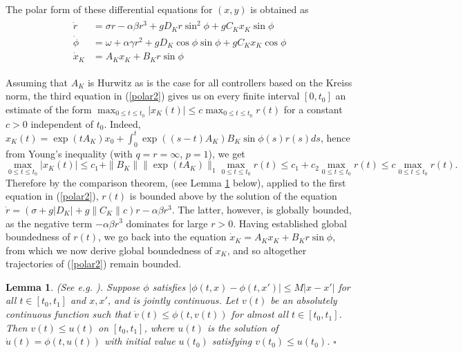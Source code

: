 \documentclass[12pt, a4paper,reqno]{amsart}
\newtheorem{lemma}{\bf Lemma}
\theoremstyle{definition}
\begin{document}
The polar form of these differential equations for $(x,y)$ is obtained as
\begin{align}
\label{polar2}
\begin{split}
    \dot{r}& =  \sigma r - \alpha \beta r^3 + g D_K r\sin^2 \phi + gC_K x_K \sin \phi  \\
     \dot{\phi} &= \omega + \alpha \gamma r^2  + g D_K \cos\phi \sin\phi + g C_K x_K \cos \phi  \\
     \dot{x}_K &= A_K x_K + B_K r \sin \phi
     \end{split}
\end{align} 

Assuming that 
$A_K$ is Hurwitz as is the case for all controllers based on the Kreiss norm, the third equation in (\ref{polar2}) gives us on every finite interval $[0,t_0]$ 
an estimate of the form $\max_{0 \leq t \leq t_0}|x_K(t)| \leq c \max_{0\leq t \leq t_0} r(t)$ for a constant $c >0$
independent of $t_0$.
Indeed, $x_K(t) = \exp(tA_K)x_0+ \int_0^t \exp((s-t)A_K) B_K \sin \phi(s) r(s)ds$, hence from Young's inequality
(with $q=r=\infty$, $p=1$), we get
$$\max_{0 \leq t \leq t_0} |x_K(t)| \leq c_1 + \|B_K\|\| \exp(t A_K)\|_1 \max_{0 \leq t\leq t_0}r(t)\leq c_1 + c_2 \max_{0\leq t\leq t_0} r(t) \leq c \max_{0\leq t \leq t_0} r(t).$$
Therefore by the comparison theorem, (see Lemma \ref{comparison} below), applied to the first equation in (\ref{polar2}),
$r(t)$ 
is bounded above by the solution of the equation $\dot{r} = (\sigma + g|D_K| + g\|C_K\|c)r - \alpha\beta r^3$.
The latter, however, is globally bounded, as the negative term $-\alpha\beta r^{3}$ dominates for large $r>0$.
Having established global boundedness of $r(t)$, we go back into the equation $\dot{x}_K=A_Kx_K+B_K r\sin \phi$, from which we now
derive global boundedness of $x_K$, and so altogether trajectories of (\ref{polar2}) remain bounded.
%
\begin{lemma}
\label{comparison}
{\rm (See e.g. \cite[Thm. 2.1, p. 93]{zabczyk2020mathematical})}.
    Suppose $\phi$ satisfies $|\phi(t,x)-\phi(t,x')| \leq M|x-x'|$ for all $t\in [t_0,t_1]$ and $x,x'$, and is jointly continuous. Let $v(t)$ be an absolutely continuous function
    such that $\dot{v}(t) \leq \phi(t,v(t))$ for almost all $t\in [t_0,t_1]$. Then
    $v(t) \leq u(t)$ on $[t_0,t_1]$, where $u(t)$ is the solution of $\dot{u}(t)=\phi(t,u(t))$ with initial value $u(t_0)$
 satisfying   $v(t_0)\leq u(t_0)$. \hfill $\square$
\end{lemma}
\end{document}
